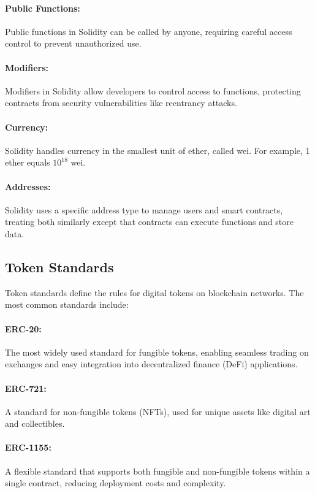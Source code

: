 \paragraph{Public Functions:}
Public functions in Solidity can be called by anyone, requiring careful access
control to prevent unauthorized use.

\paragraph{Modifiers:}
Modifiers in Solidity allow developers to control access to functions,
protecting contracts from security vulnerabilities like reentrancy attacks.

\paragraph{Currency:}
Solidity handles currency in the smallest unit of ether, called wei. For
example, 1 ether equals $10^{18}$ wei.

\paragraph{Addresses:}
Solidity uses a specific address type to manage users and smart contracts,
treating both similarly except that contracts can execute functions and store
data.

\subsection{Token Standards}
\label{subsec:token_standards}

Token standards define the rules for digital tokens on blockchain networks. The
most common standards include:

\paragraph{ERC-20:}
The most widely used standard for fungible tokens, enabling seamless trading on
exchanges and easy integration into decentralized finance (DeFi) applications.

\paragraph{ERC-721:}
A standard for non-fungible tokens (NFTs), used for unique assets like digital
art and collectibles.

\paragraph{ERC-1155:}
A flexible standard that supports both fungible and non-fungible tokens within
a single contract, reducing deployment costs and complexity.

